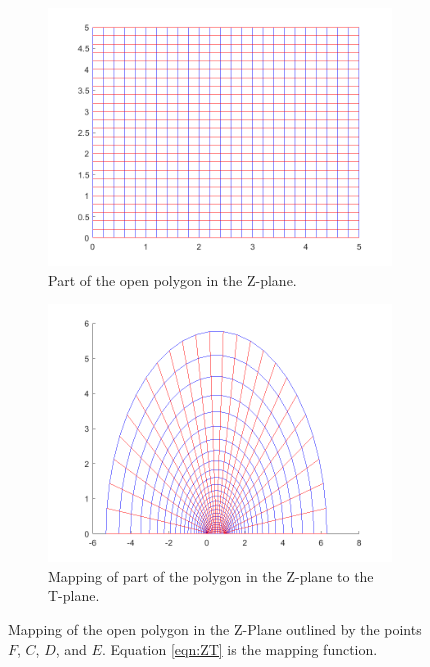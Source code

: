      \begin{figure}[h]
    \centering
    \begin{subfigure}[t]{0.45\textwidth}
        \centering
        \includegraphics[width=\textwidth]{images/ZtoT_strip.png}
        \caption{Part of the open polygon in the Z-plane.}
    \end{subfigure}
    \hfill
    \begin{subfigure}[t]{0.45\textwidth}
        \centering
        \includegraphics[width=\textwidth]{images/ZtoT_map.png}
        \caption{Mapping of part of the polygon in the Z-plane to the T-plane.}
    \end{subfigure} 
    \caption[Mapping of the open polygon in the Z-Plane to the T-plane.]{Mapping of the open polygon in the Z-Plane outlined by the points $F$, $C$, $D$, and $E$. Equation \ref{eqn:ZT} is the mapping function.} 
    \label{fig:Z_to_T_mapping}
 \end{figure}

